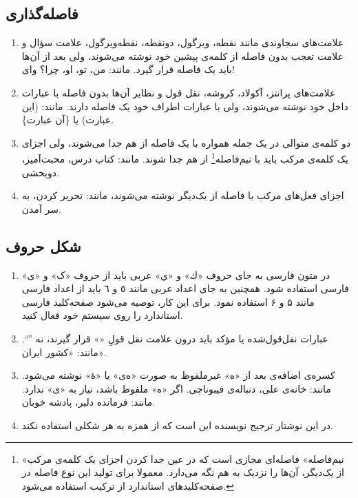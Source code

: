 \subsection{فاصله‌گذاری}
\begin{enumerate}

\item 
علامت‌های سجاوندی مانند نقطه، ویرگول، دونقطه، نقطه‌ویرگول، علامت سؤال و علامت تعجب بدون فاصله از کلمه‌ی پیشین خود نوشته می‌شوند، ولی بعد از آن‌ها باید یک فاصله‌ قرار گیرد. مانند: من، تو، او، چرا؟ وای!
\item
علامت‌های پرانتز، آکولاد، کروشه، نقل قول و نظایر آن‌ها بدون فاصله با عبارات داخل خود نوشته می‌شوند، ولی با عبارات اطراف خود یک فاصله دارند. مانند: (این عبارت) یا \{آن عبارت\}.
\item 
دو کلمه‌ی متوالی در یک جمله همواره با یک فاصله از هم جدا می‌شوند، ولی اجزای یک کلمه‌ی مرکب باید با نیم‌فاصله\footnote{«نیم‌فاصله» فاصله‌‌ای مجازی است که در عین جدا کردن اجزای یک کلمه‌ی مرکب از یک‌دیگر، آن‌ها را نزدیک به هم نگه می‌دارد. معمولا برای تولید این نوع فاصله در صفحه‌کلید‌های استاندارد از ترکیب  استفاده می‌شود.}‌‌
 از هم جدا شوند. مانند: کتاب درس، محبت‌آمیز، دوبخشی.
\item 
 اجزای فعل‌های مرکب با فاصله از یک‌دیگر نوشته می‌شوند، مانند: تحریر کردن، به سر آمدن.
\end{enumerate}


\subsection{شکل حروف}
\begin{enumerate}
\item 
در متون فارسی به جای حروف «ك» و «ي» عربی باید از حروف «ک» و «ی» فارسی استفاده شود. همچنین به جای اعداد عربی مانند ٥ و ٦ باید از اعداد فارسی مانند ۵ و ۶ استفاده نمود. برای این کار، توصیه می‌شود صفحه‌کلید‌ فارسی استاندارد را روی سیستم خود فعال کنید.
\item 
عبارات نقل‌قول‌شده یا مؤکد باید درون علامت نقل قولِ «» قرار گیرند، نه ''``. مانند: «کشور ایران».
\item 
کسره‌ی اضافه‌ی بعد از «ه» غیرملفوظ به صورت «ه‌ی» یا «هٔ» نوشته می‌شود. مانند: خانه‌ی علی، دنباله‌ی فیبوناچی. اگر «ه» ملفوظ باشد، نیاز به «‌ی» ندارد. مانند: فرمانده دلیر، پادشه خوبان. 
\item 
در این نوشتار ترجیح نویسنده این است که از همزه به هر شکلی استفاده نکند. 
\end{enumerate}


